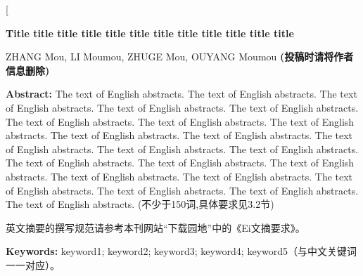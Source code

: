 \documentclass[10.5pt,twocolumn]{aaas}
\newcommand\mycolorRed[1]{{\color{red}#1}}
\newcommand\mycolorBlue[1]{{\color{blue}#1}}
\begin{document}
\twocolumn[
  \begin{@twocolumnfalse}\vspace*{1cm}

    \parbox{\textwidth}{

      \xiaosihao\ArialFont\textbf{Title title title title title title title title title title title title}
      \vspace*{0.3cm}

      {\xiaosihao ZHANG Mou, LI Moumou, ZHUGE Mou, OUYANG Moumou \mycolorBlue{\wuhao\textbf{ (投稿时请将作者信息删除)}}}\\[0.3cm]

      \vspace*{2.0cm}

      \xiaowuhao
      {
        \renewcommand{\baselinestretch}{0.8}
        \ArialFont
        \textbf{Abstract:}
        The text of English abstracts. The text of English abstracts. The text of English abstracts. The text of English abstracts. The text of English abstracts. The text of English abstracts. The text of English abstracts. The text of English abstracts. The text of English abstracts. The text of English abstracts. The text of English abstracts. The text of English abstracts. The text of English abstracts. The text of English abstracts. The text of English abstracts. The text of English abstracts. The text of English abstracts. The text of English abstracts. The text of English abstracts. The text of English abstracts. The text of English abstracts. The text of English abstracts.  \mycolorRed{(不少于150词,具体要求见3.2节)}

        英文摘要的撰写规范请参考本刊网站“下载园地”中的《Ei文摘要求》。

        \textbf{Keywords:} keyword1; keyword2; keyword3; keyword4; keyword5（与中文关键词一一对应）。
      }
    }



\end{@twocolumnfalse}
\end{document}

